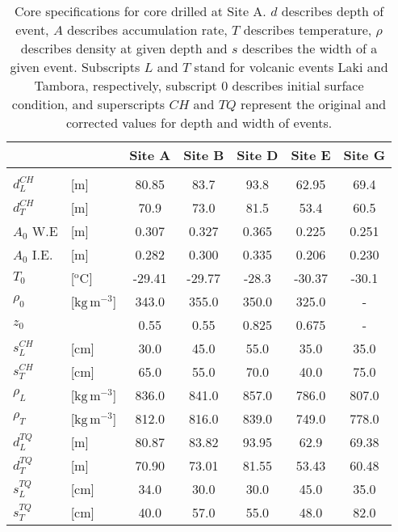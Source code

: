 \documentclass[../../CompleteThesis2/Complete_2ndDraft]{subfiles}
\begin{document}
	\begin{table}[h]
	\centering
	\begin{tabular}{l l|c c c c c}
		& & \textbf{Site A}& \textbf{Site B}& \textbf{Site D}& \textbf{Site E}& \textbf{Site G} \\[0.1cm]
		\hline 
		&&&&&& \\
		$d_{L}^{CH}$ & [m] & 80.85 & 83.7 & 93.8 & 62.95 & 69.4 \\[0.15cm]
		$d_{T}^{CH}$ & [m] & 70.9 & 73.0 & 81.5 & 53.4 & 60.5 \\[0.15cm]
		$A_0$ W.E & [m] & 0.307 & 0.327 & 0.365 & 0.225 & 0.251 \\[0.15cm]
		$A_0$ I.E. & [m] & 0.282 & 0.300 & 0.335 & 0.206 & 0.230 \\[0.15cm]
		$T_0$ & [$^{\text{o}}$C] & -29.41 & -29.77 & -28.3 & -30.37 & -30.1 \\[0.15cm]
		$\rho_0$ & [$\text{kg}\,\text{m}^{-3}$] & 343.0 & 355.0 & 350.0 & 325.0 & - \\[0.15cm]
		$z_0$ & & 0.55 & 0.55 & 0.825 & 0.675 & - \\[0.15cm]
		$s_L^{CH}$ & [cm] & 30.0 & 45.0 & 55.0 & 35.0 & 35.0 \\[0.15cm]
		$s_T^{CH}$ & [cm] & 65.0 & 55.0 & 70.0 & 40.0 & 75.0 \\[0.15cm]
		$\rho_L$ & [$\text{kg}\,\text{m}^{-3}$] & 836.0 & 841.0 & 857.0 & 786.0 & 807.0 \\[0.15cm]
		$\rho_T$ & [$\text{kg}\,\text{m}^{-3}$] & 812.0 & 816.0 & 839.0 & 749.0 & 778.0 \\[0.15cm]		
		$d_{L}^{TQ}$ & [m] & 80.87 & 83.82 & 93.95 & 62.9 & 69.38 \\[0.15cm]
		$d_{T}^{TQ}$ & [m] & 70.90 & 73.01 & 81.55 & 53.43 & 60.48\\[0.15cm]
		$s_L^{TQ}$ & [cm] & 34.0 & 30.0 & 30.0 & 45.0 & 35.0 \\[0.15cm]
		$s_T^{TQ}$ & [cm] & 40.0 & 57.0 & 55.0 & 48.0 & 82.0 \\[0.15cm]
		
	\end{tabular}
	\caption[Core specifications for core drilled at Site A]{\small Core specifications for core drilled at Site A. $d$ describes depth of event, $A$ describes accumulation rate, $T$ describes temperature, $\rho$ describes density at given depth and $s$ describes the width of a given event. Subscripts $L$ and $T$ stand for volcanic events Laki and Tambora, respectively, subscript $0$ describes initial surface condition, and superscripts $CH$ and $TQ$ represent the original and corrected values for depth and width of events.}
	\label{Tab:Sites_CoreSpecs}
\end{table}
\end{document}

